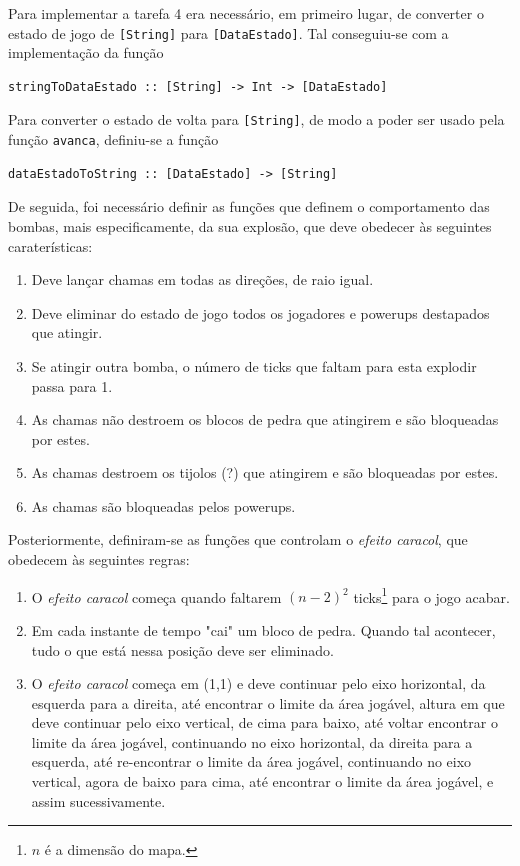 \documentclass[a4paper]{article}
\begin{document}
Para implementar a tarefa 4 era necessário, em primeiro lugar, de converter o estado de jogo de \texttt{[String]} para \texttt{[DataEstado]}. Tal conseguiu-se com a implementação da função
\begin{verbatim}
stringToDataEstado :: [String] -> Int -> [DataEstado]
\end{verbatim}

Para converter o estado de volta para \texttt{[String]}, de modo a poder ser usado pela função \texttt{avanca}, definiu-se a função
\begin{verbatim}
dataEstadoToString :: [DataEstado] -> [String]
\end{verbatim}

De seguida, foi necessário definir as funções que definem o comportamento das bombas, mais especificamente, da sua explosão, que deve obedecer às seguintes caraterísticas:
\begin{enumerate}
  \item Deve lançar chamas em todas as direções, de raio igual.
  \item Deve eliminar do estado de jogo todos os jogadores e powerups destapados que atingir.
  \item Se atingir outra bomba, o número de ticks que faltam para esta explodir passa para 1.
  \item As chamas não destroem os blocos de pedra que atingirem e são bloqueadas por estes.
  \item As chamas destroem os tijolos (?) que atingirem e são bloqueadas por estes.
  \item As chamas são bloqueadas pelos powerups.
\end{enumerate}

Posteriormente, definiram-se as funções que controlam o \emph{efeito caracol}, que obedecem às seguintes regras:
\begin{enumerate}
  \item O \emph{efeito caracol} começa quando faltarem \((n-2)^2\) ticks\footnote{\(n\) é a dimensão do mapa.} para o jogo acabar.
  \item Em cada instante de tempo "cai" um bloco de pedra. Quando tal acontecer, tudo o que está nessa posição deve ser eliminado.
  \item O \emph{efeito caracol} começa em (1,1) e deve continuar pelo eixo horizontal, da esquerda para a direita, até encontrar o limite da área jogável, altura em que deve continuar pelo eixo vertical, de cima para baixo, até voltar encontrar o limite da área jogável, continuando no eixo horizontal, da direita para a esquerda, até re-encontrar o limite da área jogável, continuando no eixo vertical, agora de baixo para cima, até encontrar o limite da área jogável, e assim sucessivamente.
\end{enumerate}
\end{document}
